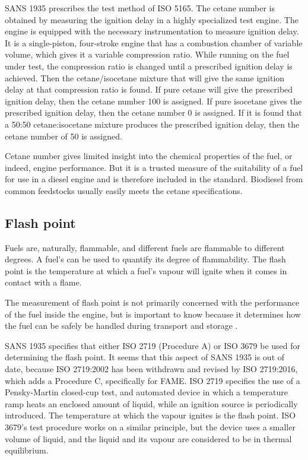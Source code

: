 SANS 1935 prescribes the test method of ISO 5165. The cetane number is obtained
by measuring the ignition delay in a highly specialized test engine. The engine
is equipped with the necessary instrumentation to measure ignition delay. It is
a single-piston, four-stroke engine that has a combustion chamber of variable
volume, which gives it a variable compression ratio. While running on the fuel
under test, the compression ratio is changed until a prescribed ignition delay
is achieved. Then the cetane/isocetane mixture that will give the same ignition
delay at that compression ratio is found. If pure cetane will give the
prescribed ignition delay, then the cetane number 100 is assigned. If pure
isocetane gives the prescribed ignition delay, then the cetane number 0 is
assigned. If it is found that a 50:50 cetane:isocetane mixture produces the
prescribed ignition delay, then the cetane number of 50 is assigned.

Cetane number gives limited insight into the chemical properties of the fuel, or
indeed, engine performance. But it is a trusted measure of the suitability of a
fuel for use in a diesel engine and is therefore included in the standard.
Biodiesel from common feedstocks usually easily meets the cetane specifications.

\subsection{Flash point}

Fuels are, naturally, flammable, and different fuels are flammable to different
degrees. A fuel's  can be used to quantify its degree of
flammability. The flash point is the temperature at which a fuel's vapour will
ignite when it comes in contact with a flame. 

The measurement of flash point is not primarily concerned with the performance
of the fuel inside the engine, but is important to know because it determines
how the fuel can be safely be handled during transport and storage
\autocite{WFCC2009}.

SANS 1935 specifies that either ISO 2719 (Procedure A) or ISO 3679 be used for
determining the flash point. It seems that this aspect of SANS 1935 is out of
date, because ISO 2719:2002 has been withdrawn and revised by ISO 2719:2016,
which adds a Procedure C, specifically for FAME. ISO 2719 specifies the use of a
Pensky-Martin closed-cup test, and automated device in which a temperature ramp
heats an enclosed amount of liquid, while an ignition source is periodically
introduced. The temperature at which the vapour ignites is the flash point. ISO
3679's test procedure works on a similar principle, but the device uses a
smaller volume of liquid, and the liquid and its vapour are considered to be in
thermal equilibrium.

